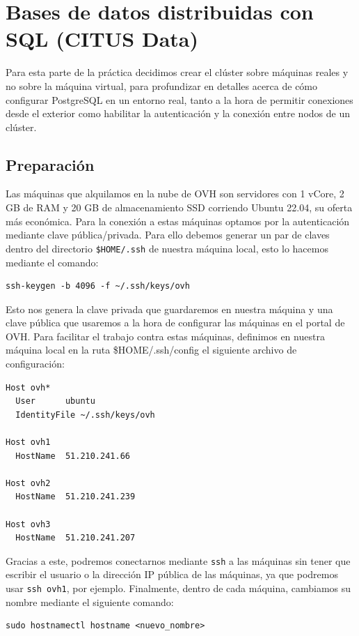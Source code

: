 \section{Bases de datos distribuidas con SQL (CITUS Data)}

Para esta parte de la práctica decidimos crear el clúster sobre máquinas reales y no sobre la máquina virtual, para profundizar en detalles acerca de cómo configurar PostgreSQL en un entorno real, tanto a la hora de permitir conexiones desde el exterior como habilitar la autenticación y la conexión entre nodos de un clúster.

\subsection*{Preparación}

Las máquinas que alquilamos en la nube de OVH son servidores con 1 vCore, 2 GB de RAM y 20 GB de almacenamiento SSD corriendo Ubuntu 22.04, su oferta más económica. Para la conexión a estas máquinas optamos por la autenticación mediante clave pública/privada. Para ello debemos generar un par de claves dentro del directorio \texttt{\$HOME/.ssh} de nuestra máquina local, esto lo hacemos mediante el comando:
\begin{verbatim}
ssh-keygen -b 4096 -f ~/.ssh/keys/ovh
\end{verbatim}

Esto nos genera la clave privada que guardaremos en nuestra máquina y una clave pública que usaremos a la hora de configurar las máquinas en el portal de OVH. Para facilitar el trabajo contra estas máquinas, definimos en nuestra máquina local en la ruta \$HOME/.ssh/config el siguiente archivo de configuración:

\begin{verbatim}
Host ovh*
  User      ubuntu
  IdentityFile ~/.ssh/keys/ovh

Host ovh1
  HostName  51.210.241.66

Host ovh2
  HostName  51.210.241.239

Host ovh3
  HostName  51.210.241.207
\end{verbatim}

Gracias a este, podremos conectarnos mediante \texttt{ssh} a las máquinas sin tener que escribir el usuario o la dirección IP pública de las máquinas, ya que podremos usar \texttt{ssh ovh1}, por ejemplo. Finalmente, dentro de cada máquina, cambiamos su nombre mediante el siguiente comando:
\begin{verbatim}
sudo hostnamectl hostname <nuevo_nombre>
\end{verbatim}

